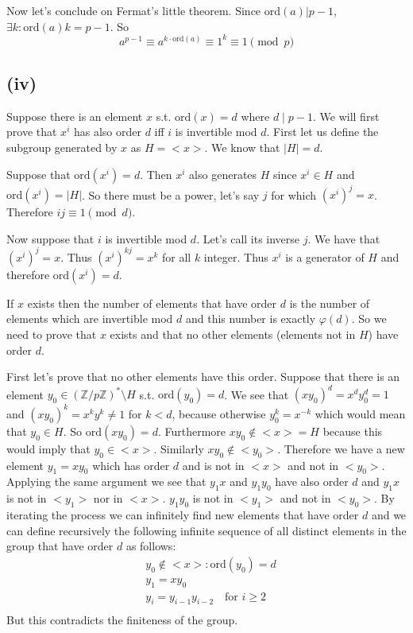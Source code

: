 \documentclass[12pt,a4paper]{article}
\newcommand {\zpz}[1]{\mathbb{Z}/#1\mathbb{Z}}
\newcommand {\ord}{\mathrm{ord}}
\begin{document}
Now  let's conclude on Fermat's little theorem.
Since $\ord(a) | p-1$, $\exists k: \ord(a)k=p-1$. So 
\[
    a^{p-1} \equiv a^{k\cdot\ord(a)} \equiv 1^k \equiv 1 \pmod p
\]

\subsection*{(iv)}
Suppose there is an element $x$ s.t. $\ord(x) = d$ where $d \mid p-1$. We will first prove that 
$x^i$ has also order $d$ iff $i$ is invertible mod $d$. First let us define the subgroup generated by $x$ as $H = <x>$. We know that $|H| = d$.

Suppose that $\ord(x^i) = d$. Then $x^i$ also generates $H$ since $x^i \in H$ and $\ord(x^i) = |H|$. So there must be a power, let's say $j$  for which 
$(x^i)^j = x$. Therefore $ij \equiv 1 \pmod d$.

Now suppose that $i$ is invertible mod $d$. Let's call its inverse $j$. We have that $(x^i)^j = x$. Thus $(x^i)^{kj} = x^k$ for all $k$ integer. Thus $x^i$  is a generator
of $H$ and therefore $\ord(x^i) = d$.

If $x$ exists then the number of elements that have order $d$ is the number of elements which are invertible mod $d$ and this number is exactly $\varphi(d)$.
So we need to prove that $x$ exists and that no other elements (elements not in $H$) have order $d$.

First let's prove that no other elements have this order. Suppose that there is an element $y_0 \in (\zpz p)^* \setminus H$ s.t. $\ord(y_0) = d$.
We see that $(xy_0)^d = x^dy_0^d = 1$ and $(xy_0)^k = x^ky^k \neq 1$ for $k < d$, because otherwise $y_0^{k} = x^{-k}$ which would mean that $y_0 \in H$.
So $\ord(xy_0) = d$. Furthermore $xy_0 \notin <x> = H$ because this would imply that $y_0 \in <x>$. Similarly $xy_0 \notin <y_0>$.
Therefore we have a new element $y_1=xy_0$ which has order $d$ and is not in $<x>$ and not in $<y_0>$. Applying the same argument we see that $y_1x$ and $y_1y_0$ have also order $d$
and $y_1x$ is not in $<y_1>$ nor in $<x>$. $y_1y_0$ is not in $<y_1>$ and not in $<y_0>$. By iterating the process we can infinitely find new elements that have order $d$
and we can define recursively the following infinite sequence of all distinct elements in the group that have order $d$ as follows:
\[
    \begin{split}
        & y_0 \notin <x>: \ord(y_0) = d\\
        & y_1 = xy_0\\ 
        & y_i = y_{i-1}y_{i-2} \quad \mbox{for } i \geq 2 \\
    \end{split}
\]
But this contradicts the finiteness of the group.
\end{document}
